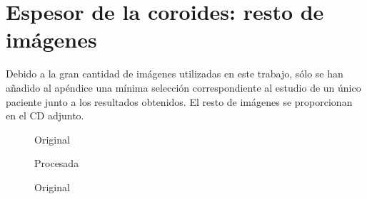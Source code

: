 \section{Espesor de la coroides: resto de imágenes}
Debido a la gran cantidad de imágenes utilizadas en este trabajo, sólo
se han añadido al apéndice una mínima selección correspondiente al
estudio de un único paciente junto a los resultados obtenidos. El
resto de imágenes se proporcionan en el CD adjunto.
\begin{figure}[H]
  \caption{Original}
  \centering \setlength\fboxsep{0pt} \setlength\fboxrule{0.5pt}
\end{figure}

\begin{figure}[H]
  \caption{Procesada}
  \centering \setlength\fboxsep{0pt} \setlength\fboxrule{0.5pt}
\end{figure}



\begin{figure}[H]
  \caption{Original}
  \centering \setlength\fboxsep{0pt} \setlength\fboxrule{0.5pt}
\end{figure}

